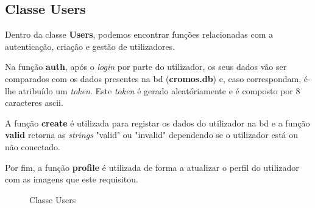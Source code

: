 \documentclass{report}
\begin{document}
\subsection{Classe Users}
\label{ssec.users}

Dentro da classe \textbf{Users}, podemos encontrar funções relacionadas com a autenticação, criação e gestão de utilizadores.

Na função \textbf{auth}, após o \textit{login} por parte do utilizador, os seus dados vão ser comparados com os dados presentes na \ac{bd} (\textbf{cromos.db}) e, caso correspondam, é-lhe atribuído um \textit{token}. Este \textit{token} é gerado aleatóriamente e é composto por 8 caracteres \ac{ascii}.

A função \textbf{create} é utilizada para registar os dados do utilizador na \ac{bd} e a função \textbf{valid} retorna as \textit{strings} "valid" ou "invalid" dependendo se o utilizador está ou não conectado.

Por fim, a função \textbf{profile} é utilizada de forma a atualizar o perfil do utilizador com as imagens que este requisitou.

\begin{figure}[H]%
    \centering
    \qquad
    \caption{Classe Users}%
    \label{fig:usersimg}%
\end{figure}
\end{document}
